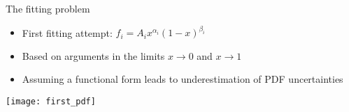 \begin{frame}{The fitting problem}

\vspace*{\titleskip}

\begin{itemize}
	
\item First fitting attempt: $f_i=A_ix^{\alpha_i}(1-x)^{\beta_i}$
	
\item Based on arguments in the limits $x\rightarrow 0$ and $x \rightarrow 1$


\item Assuming a functional form leads to underestimation of PDF uncertainties

	
\end{itemize}

\vspace*{\secondskip}

\begin{center}
\texttt{[image: first\_pdf]}\\
{\small {}}
\end{center}

\end{frame}


